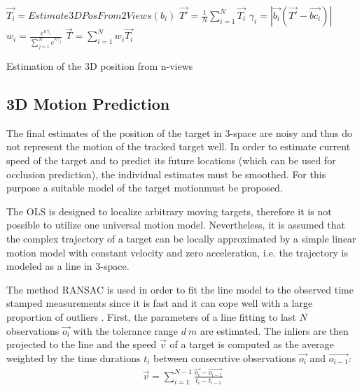 \begin{algorithm}
	\SetAlgoNoLine	
	\DontPrintSemicolon
	\BlankLine
	
	{
		$\vec{T_{i}} = Estimate3DPosFrom2Views(b_{i})$\;
	}
	$\vec{T'} = \frac{1}{N}\sum_{i=1}^{N}\vec{T_{i}}$\;	
	{
		$\gamma_{i} = |\vec{b_{i}}(\vec{T'} - \vec{bc_{i}})|$\;
		$w_{i} = \frac{e^{\kappa\gamma_{i}}}{\sum_{j=1}^{N}e^{\kappa\gamma_{j}}}$\;
	}
	$\vec{T} = \sum_{i=1}^{N}w_{i}\vec{T_{i}}$	
	\caption{Estimation of the 3D position from n-views}
	\label{alg:3dPosEstimation}
\end{algorithm}


\subsection{3D Motion Prediction} \label{txt:3d_motion_predicition}

The final estimates of the position of the target in 3-space are noisy and thus do not represent the motion of the tracked target well. In order to estimate current speed of the target and to predict its future locations (which can be used for occlusion prediction), the individual estimates must be smoothed. For this purpose a suitable model of the target motionmust be proposed.

The OLS is designed to localize arbitrary moving targets, therefore it is not possible to utilize one universal motion model. Nevertheless, it is assumed that the complex trajectory of a target can be locally approximated by a simple linear motion model with constant velocity and zero acceleration, i.e. the trajectory is modeled as a line in 3-space.

The method RANSAC is used in order to fit the line model to the observed time stamped measurements since it is fast and it can cope well with a large proportion of outliers \cite{Hartley:2003:MVG:861369}. First, the parameters of a line fitting to last $N$ observations $\vec{o_{i}}$ with the tolerance range $d~m$ are estimated. The inliers are then projected to the line and the speed $\vec{v}$ of a target is computed as the average weighted by the time durations $t_{i}$ between consecutive observations $\vec{o_{i}}$ and $\vec{o_{i-1}}$:
\begin{align}
	\vec{v} = \sum_{i=1}^{N-1}{\frac{\vec{o_{i}} - \vec{o_{i-1}}}{t_{i} - t_{i-1}}}
\end{align}

